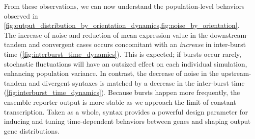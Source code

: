 \documentclass[11pt]{article}
\begin{document}
From these observations, we can now understand the population-level behaviors observed in \cref{fig:output_distribution_by_orientation_dynamics,fig:noise_by_orientation}. 
The increase of noise and reduction of mean expression value in the downstream-tandem and convergent cases occurs concomitant with an \emph{increase} in inter-burst time (\cref{fig:interburst_time_dynamics}). This is expected; if bursts occur rarely, stochastic fluctuations will have an outsized effect on each individual simulation, enhancing population variance. In contrast, the decrease of noise in the upstream-tandem and divergent syntaxes is matched by a decrease in the inter-burst time (\cref{fig:interburst_time_dynamics}). Because bursts happen more frequently, the ensemble reporter output is more stable as we approach the limit of constant transcription.
Taken as a whole, syntax provides a powerful design parameter for inducing and tuning time-dependent behaviors between genes and shaping output gene distributions.

\FloatBarrier
\end{document}
